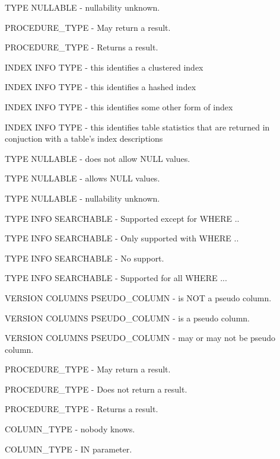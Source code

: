 \begin{description}
TYPE NULLABLE - nullability unknown. 

PROCEDURE\_TYPE - May return a result. 

PROCEDURE\_TYPE - Returns a result. 

INDEX INFO TYPE - this identifies a clustered index 

INDEX INFO TYPE - this identifies a hashed index 

INDEX INFO TYPE - this identifies some other form of index 

INDEX INFO TYPE - this identifies table statistics that are returned in conjuction with a table's index descriptions 

TYPE NULLABLE - does not allow NULL values. 

TYPE NULLABLE - allows NULL values. 

TYPE NULLABLE - nullability unknown. 

TYPE INFO SEARCHABLE - Supported except for WHERE .. 

TYPE INFO SEARCHABLE - Only supported with WHERE .. 

TYPE INFO SEARCHABLE - No support. 

TYPE INFO SEARCHABLE - Supported for all WHERE ... 

VERSION COLUMNS PSEUDO\_COLUMN - is NOT a pseudo column. 

VERSION COLUMNS PSEUDO\_COLUMN - is a pseudo column. 

VERSION COLUMNS PSEUDO\_COLUMN - may or may not be pseudo column. 
\end{description}

PROCEDURE\_TYPE - May return a result. 

PROCEDURE\_TYPE - Does not return a result. 

PROCEDURE\_TYPE - Returns a result. 

COLUMN\_TYPE - nobody knows. 

COLUMN\_TYPE - IN parameter. 

